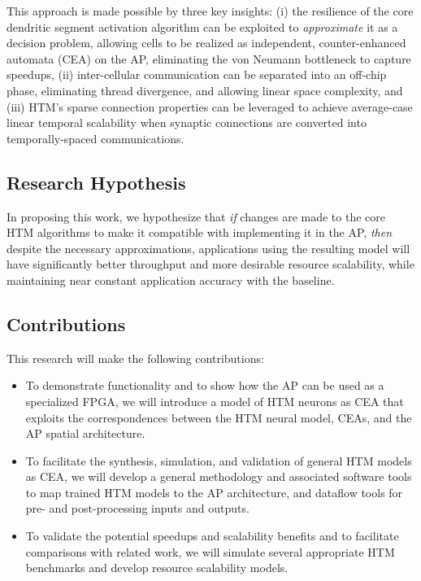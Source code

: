 This approach is made possible by three key insights: (i) the resilience of the core dendritic segment activation algorithm can be exploited to \textit{approximate} it as a decision problem, allowing cells to be realized as independent, counter-enhanced automata (CEA) on the AP, eliminating the von Neumann bottleneck to capture speedups, (ii) inter-cellular communication can be separated into an off-chip phase, eliminating thread divergence, and allowing linear space complexity, and (iii) HTM's sparse connection properties can be leveraged to achieve average-case linear temporal scalability when synaptic connections are converted into temporally-spaced communications.

\subsection{Research Hypothesis}
In proposing this work, we hypothesize that \textit{if} changes are made to the core HTM algorithms to make it compatible with implementing it in the AP, \textit{then} despite the necessary approximations, applications using the resulting model will have significantly better throughput and more desirable resource scalability, while maintaining near constant application accuracy with the baseline.


\subsection{Contributions}

This research will make the following contributions:
\begin{itemize}
    \item To demonstrate functionality and to show how the AP can be used as a specialized FPGA, we will introduce a model of HTM neurons as CEA that exploits the correspondences between the HTM neural model, CEAs, and the AP spatial architecture.
    \item To facilitate the synthesis, simulation, and validation of general HTM models as CEA, we will develop a general methodology and associated software tools to map trained HTM models to the AP architecture, and dataflow tools for pre- and post-processing inputs and outputs.
    \item To validate the potential speedups and scalability benefits and to facilitate comparisons with related work, we will simulate several appropriate HTM benchmarks and develop resource scalability models.
\end{itemize}

